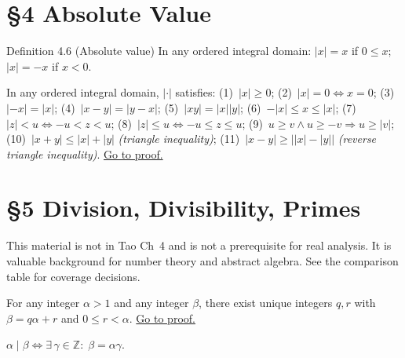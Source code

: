 \section*{\S{}4 \quad Absolute Value}

\begin{corollarybox}{Definition 4.6 (Absolute value)}
In any ordered integral domain:
$|x| = x$ if $0\leq x$; $|x|=-x$ if $x<0$.
\end{corollarybox}

\begin{theorem}
\label{thm:men-absolute-value-properties}
In any ordered integral domain, $|{\cdot}|$ satisfies:
(1)~$|x|\geq 0$;
(2)~$|x|=0\iff x=0$;
(3)~$|-x|=|x|$;
(4)~$|x-y|=|y-x|$;
(5)~$|xy|=|x||y|$;
(6)~$-|x|\leq x\leq|x|$;
(7)~$|z|<u\iff -u<z<u$;
(8)~$|z|\leq u\iff -u\leq z\leq u$;
(9)~$u\geq v \wedge u\geq -v \Rightarrow u\geq|v|$;
(10)~$|x+y|\leq|x|+|y|$ \textit{(triangle inequality)};
(11)~$|x-y|\geq\bigl||x|-|y|\bigr|$ \textit{(reverse triangle inequality)}.
\hyperref[prf:men-absolute-value-properties]{Go to proof.}
\end{theorem}

\section*{\S{}5 \quad Division, Divisibility, Primes}

\begin{remark*}[Scope]
This material is not in Tao Ch~4 and is not a prerequisite for real
analysis.  It is valuable background for number theory and abstract algebra.
See the comparison table for coverage decisions.
\end{remark*}

\begin{theorem}
\label{thm:men-euclidean-division}
For any integer $\alpha>1$ and any integer $\beta$, there exist unique
integers $q,r$ with $\beta=q\alpha+r$ and $0\leq r<\alpha$.
\hyperref[prf:men-euclidean-division]{Go to proof.}
\end{theorem}

\begin{definition}[Divisibility]
\label{def:men-divisibility}
$\alpha\mid\beta \iff \exists\,\gamma\in\mathbb{Z}:\;\beta=\alpha\gamma$.
\end{definition}

